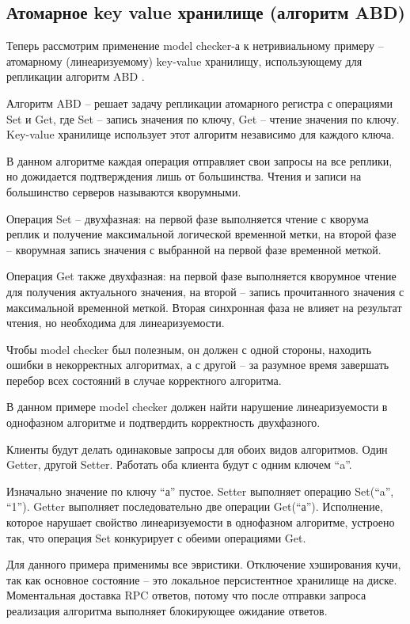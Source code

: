 \subsection{Атомарное key value хранилище (алгоритм ABD)}

Теперь рассмотрим применение model checker-а к нетривиальному примеру – атомарному (линеаризуемому) key-value хранилищу, использующему для репликации алгоритм ABD \cite{abd}.

Алгоритм ABD – решает задачу репликации атомарного регистра с операциями Set и Get, где Set – запись значения по ключу, Get – чтение значения по ключу. Key-value хранилище использует этот алгоритм независимо для каждого ключа.

В данном алгоритме каждая операция отправляет свои запросы на все реплики, но дожидается подтверждения лишь от большинства. Чтения и записи на большинство серверов называются кворумными.

Операция Set – двухфазная: на первой фазе выполняется чтение с кворума реплик и получение максимальной логической временной метки, на второй фазе – кворумная запись значения с выбранной на первой фазе временной меткой.

Операция Get также двухфазная: на первой фазе выполняется кворумное чтение для получения актуального значения, на второй – запись прочитанного значения с максимальной временной меткой. Вторая синхронная фаза не влияет на результат чтения, но необходима для линеаризуемости.

Чтобы model checker был полезным, он должен с одной стороны, находить ошибки в некорректных алгоритмах, а с другой – за разумное время завершать перебор всех состояний в случае корректного алгоритма.

В данном примере model checker должен найти нарушение линеаризуемости в однофазном алгоритме и подтвердить корректность двухфазного.

Клиенты будут делать одинаковые запросы для обоих видов алгоритмов. Один Getter, другой Setter. Работать оба клиента будут с одним ключем “a”. 

Изначально значение по ключу “а” пустое. Setter выполняет операцию Set(“a”, “1”). Getter выполняет последовательно две операции Get(“а”). Исполнение, которое нарушает  свойство линеаризуемости в однофазном алгоритме, устроено так, что операция Set конкурирует с обеими операциями Get.

Для данного примера применимы все эвристики. Отключение хэширования кучи, так как основное состояние – это локальное персистентное хранилище на диске. Моментальная доставка RPC ответов, потому что после отправки запроса реализация алгоритма выполняет блокирующее ожидание ответов.

